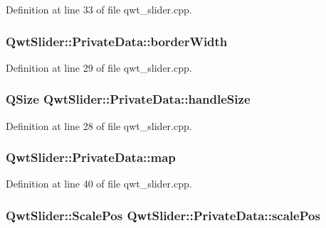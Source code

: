 Definition at line 33 of file qwt\-\_\-slider.\-cpp.

\hypertarget{class_qwt_slider_1_1_private_data_a0cfc3742e60634e203ea75b60b244e27}{
\subsubsection[{border\-Width}]{ Qwt\-Slider\-::\-Private\-Data\-::border\-Width}}\label{class_qwt_slider_1_1_private_data_a0cfc3742e60634e203ea75b60b244e27}


Definition at line 29 of file qwt\-\_\-slider.\-cpp.

\hypertarget{class_qwt_slider_1_1_private_data_a37a74d8297a3f2626691a52dfd40eaad}{
\subsubsection[{handle\-Size}]{\setlength{\rightskip}{0pt plus 5cm}Q\-Size Qwt\-Slider\-::\-Private\-Data\-::handle\-Size}}\label{class_qwt_slider_1_1_private_data_a37a74d8297a3f2626691a52dfd40eaad}


Definition at line 28 of file qwt\-\_\-slider.\-cpp.

\hypertarget{class_qwt_slider_1_1_private_data_a074f0f06d22d98825dc3080cf8e530f4}{
\subsubsection[{map}]{ Qwt\-Slider\-::\-Private\-Data\-::map}}\label{class_qwt_slider_1_1_private_data_a074f0f06d22d98825dc3080cf8e530f4}


Definition at line 40 of file qwt\-\_\-slider.\-cpp.

\hypertarget{class_qwt_slider_1_1_private_data_a4267564888ef0af4e7220104f1385221}{
\subsubsection[{scale\-Pos}]{\setlength{\rightskip}{0pt plus 5cm}Qwt\-Slider\-::\-Scale\-Pos Qwt\-Slider\-::\-Private\-Data\-::scale\-Pos}}\label{class_qwt_slider_1_1_private_data_a4267564888ef0af4e7220104f1385221}


